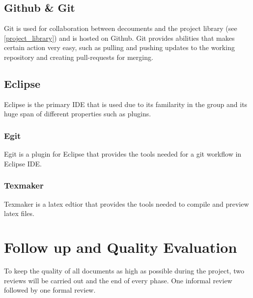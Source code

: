 \documentclass{article}
\begin{document}
    \subsection{Github \& Git}
    Git is used for collaboration between decouments and the project library (see \ref{project_library})
    and is hosted on Github. Git provides abilities that  makes certain action very
    easy, such as pulling and pushing updates to the working repository and creating pull-requests for merging.
    
    \subsection{Eclipse}
        Eclipse is the primary IDE that is used due to its familarity in
        the group and its huge span of different properties such as plugins.
    
        \subsubsection{Egit}
            Egit is a plugin for Eclipse that provides the tools needed for a git workflow 
            in Eclipse IDE.
            
        \subsubsection{Texmaker}
            Texmaker is a latex edtior that provides the tools needed to compile and preview latex files.
    
\section{Follow up and Quality Evaluation}
    To keep the quality of all documents as high as possible during the project,
    two reviews will be carried out and the end of every phase. One informal review
    followed by one formal review.
\end{document}
